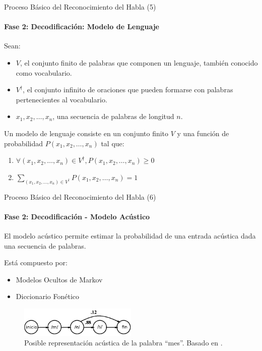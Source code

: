 \begin{frame}{Proceso B\'asico del Reconocimiento del Habla (5)}
\framesubtitle{Fase 2: Decodificaci\'on: Modelo de Lenguaje}
Sean:
\begin{itemize}
    \item $V$, el conjunto finito de palabras que componen un lenguaje, tambi\'en conocido como vocabulario.
    \item $V^\dag$, el conjunto infinito de oraciones que pueden formarse con palabras pertenecientes 
        al vocabulario.
    \item $x_1,x_2,\ldots,x_n$, una secuencia de palabras de longitud $n$.
\end{itemize}

Un modelo de lenguaje \cite{CollinsLanguage} consiste en un conjunto finito $V$ y una funci\'on 
de probabilidad $P(x_1,x_2,\ldots,x_n)$ tal que:
\begin{enumerate}

\item $\forall (x_1,x_2,\ldots,x_n) \in V^\dag, P(x_1,x_2,\ldots,x_n) \ge 0$

\item $\displaystyle \sum_{(x_1,x_2,\ldots,x_n) \in V^\dag} P(x_1,x_2,\ldots,x_n) = 1$
\end{enumerate}
\end{frame}

\begin{frame}{Proceso B\'asico del Reconocimiento del Habla (6)}
\framesubtitle{Fase 2: Decodificaci\'on - Modelo Acústico}
El modelo ac\'ustico permite estimar la probabilidad de una entrada ac\'ustica dada una secuencia de palabras. 

Está compuesto por:
\begin{itemize}
    \item Modelos Ocultos de Markov
    \item Diccionario Fonético
\end{itemize}

\begin{figure}[H] 
\centering
\includegraphics[width=0.5\textwidth]{./graphics/hmm_palabra.png}
\caption{Posible representaci\'on ac\'ustica de la palabra ``mes''. Basado en \cite{Jurafsky}.}
\label{figure:hmm-palabra}
\end{figure}

\end{frame}

